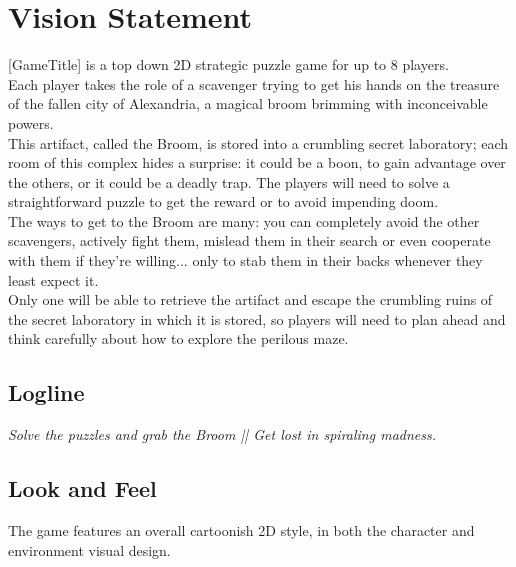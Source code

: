 \section{Vision Statement}

[GameTitle] is a top down 2D strategic puzzle game for up to 8 players. \\

Each player takes the role of a scavenger trying to get his hands on the treasure of the fallen city of Alexandria, a magical broom brimming with inconceivable powers. \\

This artifact, called the Broom, is stored into a crumbling secret laboratory; each room of this complex hides a surprise: it could be a boon, to gain advantage over the others, or it could be a deadly trap. The players will need to solve a straightforward puzzle to get the reward or to avoid impending doom. \\

The ways to get to the Broom are many: you can completely avoid the other scavengers, actively fight them, mislead them in their search or even cooperate with them if they're willing... only to stab them in their backs whenever they least expect it. \\

Only one will be able to retrieve the artifact and escape the crumbling ruins of the secret laboratory in which it is stored, so players will need to plan ahead and think carefully about how to explore the perilous maze. \\

\subsection{Logline}

\textit{Solve the puzzles and grab the Broom || Get lost in spiraling madness.}

\pagebreak 

\subsection{Look and Feel}

The game features an overall cartoonish 2D style, in both the character and environment visual design. 




